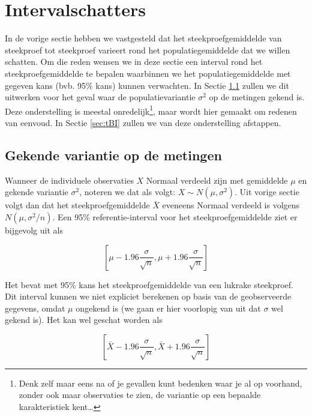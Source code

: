 \documentclass[12pt,dutch,coursenotes]{book}
\let\rmarkdownfootnote\footnote%
\def\footnote{\protect\rmarkdownfootnote}
\theoremstyle{definition}
\theoremstyle{definition}
\theoremstyle{definition}
\theoremstyle{remark}
\begin{document}
\section{Intervalschatters}\label{intervalschatters}

In de vorige sectie hebben we vastgesteld dat het steekproefgemiddelde
van steekproef tot steekproef varieert rond het populatiegemiddelde dat
we willen schatten. Om die reden wensen we in deze sectie een interval
rond het steekproefgemiddelde te bepalen waarbinnen we het
populatiegemiddelde met gegeven kans (bvb. 95\% kans) kunnen verwachten.
In Sectie \ref{subsec:bigek} zullen we dit uitwerken voor het geval waar
de populatievariantie \(\sigma^2\) op de metingen gekend is. Deze
onderstelling is meestal onredelijk\footnote{Denk zelf maar eens na of
  je gevallen kunt bedenken waar je al op voorhand, zonder ook maar
  observaties te zien, de variantie op een bepaalde karakteristiek
  kent\ldots{}}, maar wordt hier gemaakt om redenen van eenvoud. In
Sectie \ref{sec:tBI} zullen we van deze onderstelling afstappen.

\subsection{Gekende variantie op de metingen}\label{subsec:bigek}

Wanneer de individuele observaties \(X\) Normaal verdeeld zijn met
gemiddelde \(\mu\) en gekende variantie \(\sigma^2\), noteren we dat als
volgt: \(X\sim N(\mu,\sigma^2)\). Uit vorige sectie volgt dan dat het
steekproefgemiddelde \(\bar{X}\) eveneens Normaal verdeeld is volgens
\(N(\mu,\sigma^2/n)\). Een 95\% referentie-interval voor het
steekproefgemiddelde ziet er bijgevolg uit als

\begin{equation*}
\left[\mu - 1.96 \frac{\sigma}{\sqrt{n}},\mu + 1.96 \frac{\sigma}{\sqrt{n}}%
\right]
\end{equation*}

Het bevat met 95\% kans het steekproefgemiddelde van een lukrake
steekproef. Dit interval kunnen we niet expliciet berekenen op basis van
de geobserveerde gegevens, omdat \(\mu\) ongekend is (we gaan er hier
voorlopig van uit dat \(\sigma\) wel gekend is). Het kan wel geschat
worden als

\begin{equation*}
\left[\bar X - 1.96 \frac{\sigma}{\sqrt{n}},\bar X + 1.96 \frac{\sigma}{\sqrt{n}}\right]
\end{equation*}
\end{document}
